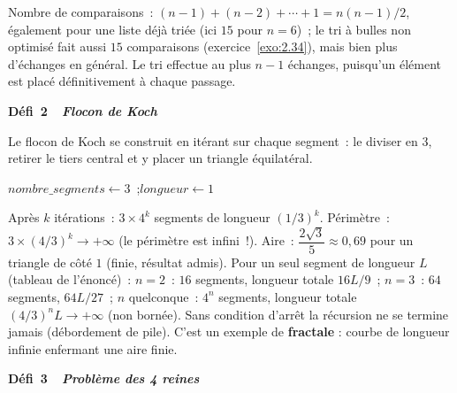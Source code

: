 Nombre de comparaisons~: $(n-1)+(n-2)+\cdots+1=n(n-1)/2$, \'egalement pour une liste d\'ej\`a tri\'ee (ici $15$ pour $n=6$)~; le tri \`a bulles non optimis\'e fait aussi $15$ comparaisons (exercice~\ref{exo:2.34}), mais bien plus d'\'echanges en g\'en\'eral.
Le tri effectue au plus $n-1$ échanges, puisqu'un élément est placé définitivement
à chaque passage.

\noindent{}
{\color{BO}\bfseries\small D\'efi~2~\textendash\ \textit{Flocon de Koch}}
\par\smallskip

Le flocon de Koch se construit en it\'erant sur chaque segment~:
le diviser en $3$, retirer le tiers central et y placer un triangle \'equilat\'eral.

\begin{algorithm}[H]
\caption{Flocon de Koch (simulation)}
$\mathit{nombre\_segments} \leftarrow 3$~;\quad $\mathit{longueur} \leftarrow 1$\;
\end{algorithm}

Apr\`es $k$ it\'erations~: $3\times4^k$ segments de longueur $(1/3)^k$.
P\'erim\`etre~: $3\times(4/3)^k\to+\infty$ (le p\'erim\`etre est infini~!).
Aire~: $\dfrac{2\sqrt{3}}{5}\approx0{,}69$ pour un triangle de c\^ot\'e $1$ (finie, r\'esultat admis).
Pour un seul segment de longueur $L$ (tableau de l'\'enonc\'e)~: $n=2$~: $16$ segments, longueur totale $16L/9$~;
$n=3$~: $64$ segments, $64L/27$~; $n$ quelconque~: $4^n$ segments, longueur totale $(4/3)^nL\to+\infty$ (non born\'ee).
Sans condition d'arr\^et la r\'ecursion ne se termine jamais (d\'ebordement de pile).
C'est un exemple de \textbf{fractale} : courbe de longueur infinie enfermant une aire finie.

\noindent{}
{\color{BO}\bfseries\small D\'efi~3~\textendash\ \textit{Probl\`eme des 4 reines}}
\par\smallskip

\begin{algorithm}[H]
\caption{4 reines par force brute}
\end{algorithm}


